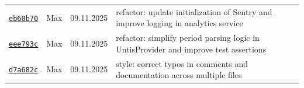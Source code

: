 \documentclass{article}%
\begin{document}
\begin{longtable}{l l l p{12cm}}
\href{https://github.com/scriptor1000/homeworks/pull/12/commits/eb60b70f9f457022b1d2a4bdd31937eac7e84110}{\underline{\texttt{eb60b70}}}&Max&09.11.2025&refactor: update initialization of Sentry and improve logging in analytics service\\%
\href{https://github.com/scriptor1000/homeworks/pull/12/commits/eee793c32b319a8c7c9c6e21cfc79f11ee9e7676}{\underline{\texttt{eee793c}}}&Max&09.11.2025&refactor: simplify period parsing logic in UntisProvider and improve test assertions\\%
\href{https://github.com/scriptor1000/homeworks/pull/12/commits/d7a682ce8f62e02e75d88147aa79a05acb412191}{\underline{\texttt{d7a682c}}}&Max&09.11.2025&style: correct typos in comments and documentation across multiple files\\%
\end{longtable}

%
\end{document}
